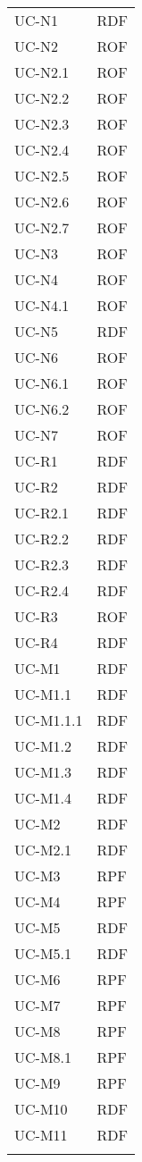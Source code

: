\begin{longtable}{| p{5cm} | p{5cm} |}
		UC-N1 & RDF\\
		UC-N2 & ROF  \\
		\rowcolor{LightGray}
		UC-N2.1 & ROF \\
		UC-N2.2 & ROF \\
		\rowcolor{LightGray}
		UC-N2.3 & ROF \\
		UC-N2.4 & ROF \\
		\rowcolor{LightGray}
		UC-N2.5 & ROF \\
		UC-N2.6 & ROF \\
		\rowcolor{LightGray}
		UC-N2.7 & ROF \\	
		UC-N3 & ROF\\	
		UC-N4 & ROF\\
		\rowcolor{LightGray}
		UC-N4.1 & ROF\\
		UC-N5 & RDF \\
		UC-N6 & ROF \\
		\rowcolor{LightGray}
		UC-N6.1 & ROF \\
		UC-N6.2 & ROF \\
		UC-N7 & ROF\\
		\rowcolor{LightGray}
		
		UC-R1 & RDF \\
		UC-R2 & RDF \\
		UC-R2.1 & RDF \\
		\rowcolor{LightGray}
		UC-R2.2 & RDF \\
		UC-R2.3 & RDF \\
		\rowcolor{LightGray}
		UC-R2.4 & RDF \\
		UC-R3 & ROF\\
		UC-R4 & RDF \\
		
		UC-M1 & RDF \\
		\rowcolor{LightGray}
		UC-M1.1 & RDF\\
		UC-M1.1.1 & RDF\\
		UC-M1.2 & RDF\\
		UC-M1.3 & RDF\\
		UC-M1.4 & RDF\\
		\rowcolor{LightGray}
		UC-M2 & RDF \\
		UC-M2.1 & RDF \\
		\rowcolor{LightGray}
		UC-M3 & RPF \\
		UC-M4 & RPF\\
		UC-M5 & RDF \\
		UC-M5.1 & RDF \\
		\rowcolor{LightGray}
		UC-M6 & RPF \\
		UC-M7 & RPF \\
		UC-M8 & RPF\\
		UC-M8.1 & RPF\\
		UC-M9 & RPF\\
		\rowcolor{LightGray}
		UC-M10 & RDF\\
		UC-M11 & RDF\\
		\rowcolor{LightGray}
		

\end{longtable}
